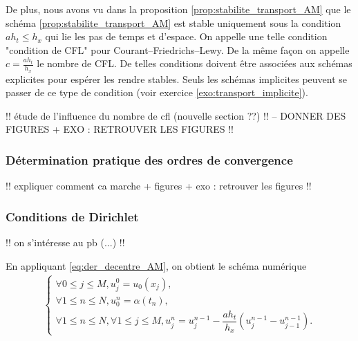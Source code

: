 \documentclass[12pt,a4paper,twoside]{article}
\begin{document}
De plus, nous avons vu dans la proposition \ref{prop:stabilite_transport_AM} que
le sch\'ema \eqref{prop:stabilite_transport_AM} est stable
uniquement sous la condition $a h_t \leq h_x$
qui lie les pas de temps et d'espace.
On appelle une telle condition "condition de CFL" pour 
Courant--Friedrichs--Lewy.
De la m\^eme fa\c{c}on on appelle $c = \frac{a h_t}{h_x}$
le nombre de CFL.
De telles conditions doivent \^etre associ\'ees aux sch\'emas
explicites pour esp\'erer les rendre stables.
Seuls les sch\'emas implicites peuvent se passer de ce
type de condition (voir exercice \ref{exo:transport_implicite}).


!! \'etude de l'influence du nombre de cfl (nouvelle section ??) !!
-- DONNER DES FIGURES + EXO : RETROUVER LES FIGURES !!


\subsubsection{D\'etermination pratique des ordres de convergence}


!! expliquer comment ca marche + figures + exo : retrouver les figures !!

\subsubsection{Conditions de Dirichlet}

!! on s'int\'eresse au pb (...) !!

En appliquant \eqref{eq:der_decentre_AM}, 
on obtient le sch\'ema num\'erique
\begin{align}
  \label{eq:transport_DF_decentre_AM_dir}
  \left\{
  \begin{array}{l}
    \forall 0 \leq j \leq M , 
    u_j^0 = u_0(x_j) ,
    \\
    \forall 1 \leq n \leq N, u_0^n = \alpha(t_n) ,
    \\
    \forall 1 \leq n \leq N, \forall 1 \leq j \leq M,
    u_j^n = u_j^{n-1} - \dfrac{a h_t}{h_x} (u_{j}^{n-1} - u_{j-1}^{n-1}) .
  \end{array}
  \right.
\end{align}
\end{document}
